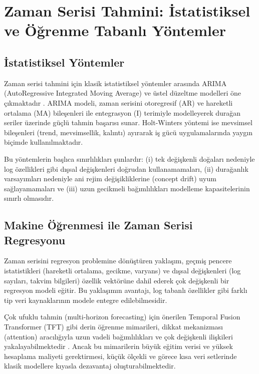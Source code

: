 \section{Zaman Serisi Tahmini: İstatistiksel ve Öğrenme Tabanlı Yöntemler}
\label{sec:zamanserisi}

\subsection{İstatistiksel Yöntemler}

Zaman serisi tahmini için klasik istatistiksel yöntemler arasında ARIMA (AutoRegressive Integrated Moving Average) ve üstel düzeltme modelleri öne çıkmaktadır \autocite{calheiros2015}.
ARIMA modeli, zaman serisini otoregresif (AR) ve hareketli ortalama (MA) bileşenleri ile entegrasyon (I) terimiyle modelleyerek durağan seriler üzerinde güçlü tahmin başarısı sunar.
Holt-Winters yöntemi ise mevsimsel bileşenleri (trend, mevsimsellik, kalıntı) ayırarak iş gücü uygulamalarında yaygın biçimde kullanılmaktadır.

Bu yöntemlerin başlıca sınırlılıkları şunlardır: (i) tek değişkenli doğaları nedeniyle log özellikleri gibi dışsal değişkenleri doğrudan kullanamamaları, (ii) durağanlık varsayımları nedeniyle ani rejim değişikliklerine (concept drift) uyum sağlayamamaları ve (iii) uzun gecikmeli bağımlılıkları modelleme kapasitelerinin sınırlı olmasıdır.

\subsection{Makine Öğrenmesi ile Zaman Serisi Regresyonu}

Zaman serisini regresyon problemine dönüştüren yaklaşım, geçmiş pencere istatistikleri (hareketli ortalama, gecikme, varyans) ve dışsal değişkenleri (log sayıları, takvim bilgileri) özellik vektörüne dahil ederek çok değişkenli bir regresyon modeli eğitir.
Bu yaklaşımın avantajı, log tabanlı özellikler gibi farklı tip veri kaynaklarının modele entegre edilebilmesidir.

Çok ufuklu tahmin (multi-horizon forecasting) için önerilen Temporal Fusion Transformer (TFT) gibi derin öğrenme mimarileri, dikkat mekanizması (attention) aracılığıyla uzun vadeli bağımlılıkları ve çok değişkenli ilişkileri yakalayabilmektedir \autocite{lim2021}.
Ancak bu mimarilerin büyük eğitim verisi ve yüksek hesaplama maliyeti gerektirmesi, küçük ölçekli ve görece kısa veri setlerinde klasik modellere kıyasla dezavantaj oluşturabilmektedir.

